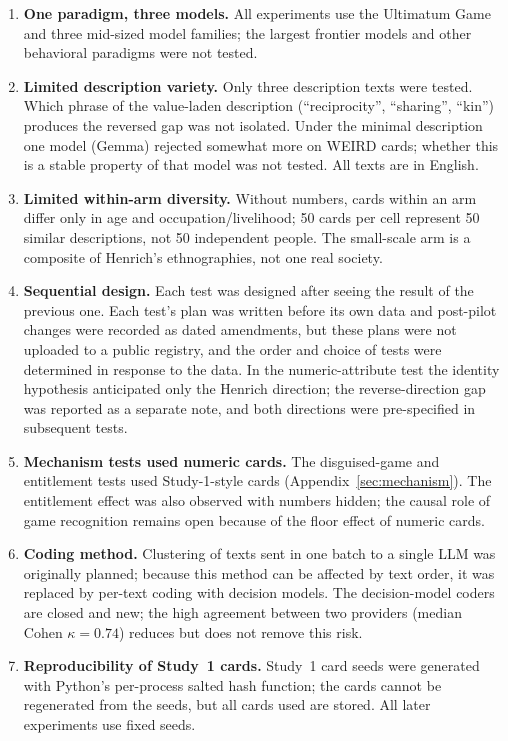 \documentclass[11pt]{article}
\begin{document}
\begin{enumerate}
\item \textbf{One paradigm, three models.} All experiments use the Ultimatum Game and three mid-sized model families; the largest frontier models and other behavioral paradigms were not tested.
\item \textbf{Limited description variety.} Only three description texts were tested. Which phrase of the value-laden description (``reciprocity'', ``sharing'', ``kin'') produces the reversed gap was not isolated. Under the minimal description one model (Gemma) rejected somewhat more on WEIRD cards; whether this is a stable property of that model was not tested. All texts are in English.
\item \textbf{Limited within-arm diversity.} Without numbers, cards within an arm differ only in age and occupation/livelihood; 50 cards per cell represent 50 similar descriptions, not 50 independent people. The small-scale arm is a composite of Henrich's ethnographies, not one real society.
\item \textbf{Sequential design.} Each test was designed after seeing the result of the previous one. Each test's plan was written before its own data and post-pilot changes were recorded as dated amendments, but these plans were not uploaded to a public registry, and the order and choice of tests were determined in response to the data. In the numeric-attribute test the identity hypothesis anticipated only the Henrich direction; the reverse-direction gap was reported as a separate note, and both directions were pre-specified in subsequent tests.
\item \textbf{Mechanism tests used numeric cards.} The disguised-game and entitlement tests used Study-1-style cards (Appendix~\ref{sec:mechanism}). The entitlement effect was also observed with numbers hidden; the causal role of game recognition remains open because of the floor effect of numeric cards.
\item \textbf{Coding method.} Clustering of texts sent in one batch to a single LLM was originally planned; because this method can be affected by text order, it was replaced by per-text coding with decision models. The decision-model coders are closed and new; the high agreement between two providers (median Cohen $\kappa = 0.74$) reduces but does not remove this risk.
\item \textbf{Reproducibility of Study~1 cards.} Study~1 card seeds were generated with Python's per-process salted hash function; the cards cannot be regenerated from the seeds, but all cards used are stored. All later experiments use fixed seeds.
\end{enumerate}
\end{document}
